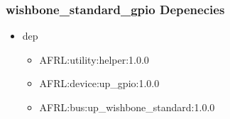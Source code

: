 \subsubsection{wishbone\_standard\_gpio Depenecies}
\begin{itemize}
\item dep
	\begin{itemize}
	\item AFRL:utility:helper:1.0.0
	\item AFRL:device:up\_gpio:1.0.0
	\item AFRL:bus:up\_wishbone\_standard:1.0.0
	\end{itemize}
\end{itemize}
